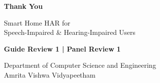 \documentclass[aspectratio=169,11pt]{beamer}
\begin{document}

\begin{frame}

\begin{center}

\vspace{1.2cm}

{\Huge\color{AmritaMaroon}\bfseries Thank You}

\vspace{0.5cm}

{\Large
Smart Home HAR for\\
Speech-Impaired \& Hearing-Impaired Users
}

\vspace{0.6cm}

\textbf{Guide Review 1 \;|\; Panel Review 1}

\vspace{0.4cm}

Department of Computer Science and Engineering\\
Amrita Vishwa Vidyapeetham

\end{center}

\end{frame}
\end{document}
